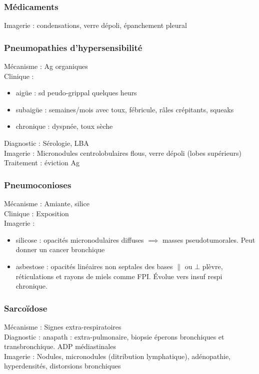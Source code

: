 \subsubsection{Médicaments}
Imagerie : condensations, verre dépoli, épanchement pleural

\subsubsection{Pneumopathies d'hypersensibilité}
Mécanisme : Ag organiques\\
Clinique : 
\begin{itemize}
\item aigüe : sd peudo-grippal quelques heurs
\item subaigüe : semaines/mois avec toux, fébricule, râles crépitants, squeaks
\item chronique : dyspnée, toux sèche
\end{itemize}
Diagnostic : Sérologie, LBA\\
Imagerie : Micronodules centrolobulaires flous, verre dépoli (lobes supérieurs)\\
Traitement : éviction Ag

\subsubsection{Pneumoconioses}
Mécanisme : Amiante, silice\\
Clinique : Exposition\\
Imagerie : 
\begin{itemize}
\item silicose : opacités micronodulaires diffuses \(\implies\) masses pseudotumorales. Peut donner un cancer bronchique
\item asbestose : opacités linéaires non septales des bases \(\parallel\) ou \(\bot\) plèvre, réticulations et rayons de miels comme FPI. Évolue vers insuf respi chronique.
\end{itemize}

\subsubsection{Sarcoïdose}
Mécanisme : Signes extra-respiratoires\\
Diagnostic : anapath : extra-pulmonaire, biopsie éperons bronchiques et transbronchique. ADP médiastinales \\
Imagerie : Nodules, micronodules (ditribution lymphatique), adénopathie, hyperdensités, distorsions bronchiques

